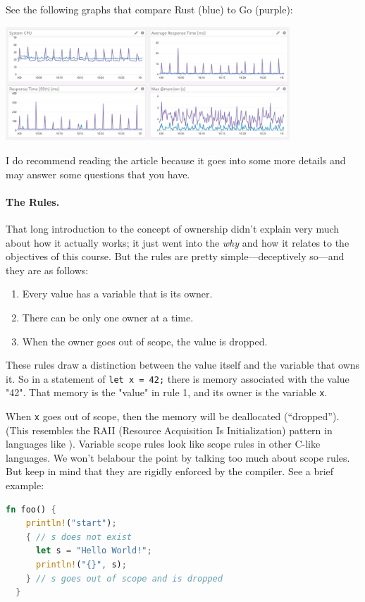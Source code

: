 See the following graphs that compare Rust (blue) to Go (purple): 
\begin{center}
\includegraphics[width=0.8\textwidth]{images/rust-vs-go.png}
\end{center}

I do recommend reading the article because it goes into some more details and may answer some questions that you have. 

\paragraph{The Rules.}
That long introduction to the concept of ownership didn't explain very much about how it actually works; it just went into the \textit{why} and how it relates to the objectives of this course. But the rules are pretty simple---deceptively so---and they are as follows:

\begin{enumerate}
	\item Every value has a variable that is its owner.
	\item There can be only one owner at a time.
	\item When the owner goes out of scope, the value is dropped.
\end{enumerate}

These rules draw a distinction between the value itself and the variable that owns it. So in a statement of \texttt{let x = 42;} there is memory associated with the value "42". That memory is the "value" in rule 1, and its owner is the variable \texttt{x}.

When \texttt{x} goes out of scope, then the memory will be deallocated (``dropped''). (This resembles the RAII (Resource Acquisition Is Initialization) pattern in languages like \CPP). Variable scope rules look like scope rules in other C-like languages. We won't belabour the point by talking too much about scope rules. But keep in mind that they are rigidly enforced by the compiler. See a brief example:
\begin{lstlisting}[language=Rust]
  fn foo() {
    println!("start");
    { // s does not exist
      let s = "Hello World!";
      println!("{}", s);
    } // s goes out of scope and is dropped
  }
\end{lstlisting}

